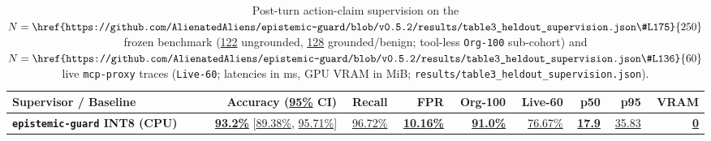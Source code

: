 \documentclass[10pt,twocolumn]{article}
\begin{document}
\begin{table}[t]
\centering
\caption{Post-turn action-claim supervision on the $N=\href{https://github.com/AlienatedAliens/epistemic-guard/blob/v0.5.2/results/table3_heldout_supervision.json\#L175}{250}$ frozen benchmark (\href{https://github.com/AlienatedAliens/epistemic-guard/blob/v0.5.2/results/table3_heldout_supervision.json\#L174}{122} ungrounded, \href{https://github.com/AlienatedAliens/epistemic-guard/blob/v0.5.2/results/table3_heldout_supervision.json\#L173}{128} grounded/benign; tool-less \texttt{Org-100} sub-cohort) and $N=\href{https://github.com/AlienatedAliens/epistemic-guard/blob/v0.5.2/results/table3_heldout_supervision.json\#L136}{60}$ live \texttt{mcp-proxy} traces (\texttt{Live-60}; latencies in ms, GPU VRAM in MiB; \texttt{results/table3\_heldout\_supervision.json}).}
\label{tab:heldout}
\footnotesize
\setlength{\tabcolsep}{0pt}
\begin{tabular*}{\textwidth}{@{\extracolsep{\fill}}lrrrrrrrr@{}}
\toprule
\textbf{Supervisor / Baseline} & \textbf{Accuracy (\href{https://github.com/AlienatedAliens/epistemic-guard/blob/v0.5.2/osaudit.toml}{95\%} CI)} & \textbf{Recall} & \textbf{FPR} & \textbf{Org-100} & \textbf{Live-60} & \textbf{p50} & \textbf{p95} & \textbf{VRAM} \\
\midrule
\textbf{\texttt{epistemic-guard} INT8 (CPU)} & \textbf{\href{https://github.com/AlienatedAliens/epistemic-guard/blob/v0.5.2/results/table3_heldout_supervision.json\#L71}{93.2\%}} [\href{https://github.com/AlienatedAliens/epistemic-guard/blob/v0.5.2/results/table3_heldout_supervision.json\#L77}{89.38\%}, \href{https://github.com/AlienatedAliens/epistemic-guard/blob/v0.5.2/results/table3_heldout_supervision.json\#L76}{95.71\%}] & \href{https://github.com/AlienatedAliens/epistemic-guard/blob/v0.5.2/results/table3_heldout_supervision.json\#L96}{96.72\%} & \textbf{\href{https://github.com/AlienatedAliens/epistemic-guard/blob/v0.5.2/results/table3_heldout_supervision.json\#L83}{10.16\%}} & \textbf{\href{https://github.com/AlienatedAliens/epistemic-guard/blob/v0.5.2/results/table3_heldout_supervision.json\#L92}{91.0\%}} & \href{https://github.com/AlienatedAliens/epistemic-guard/blob/v0.5.2/results/table3_heldout_supervision.json\#L108}{76.67\%} & \textbf{\href{https://github.com/AlienatedAliens/epistemic-guard/blob/v0.5.2/results/table3_heldout_supervision.json\#L86}{17.9}} & \href{https://github.com/AlienatedAliens/epistemic-guard/blob/v0.5.2/results/table3_heldout_supervision.json\#L87}{35.83} & \textbf{\href{https://github.com/AlienatedAliens/epistemic-guard/blob/v0.5.2/results/table3_heldout_supervision.json\#L84}{0}} \\

\end{tabular*}
\end{table}
\end{document}
